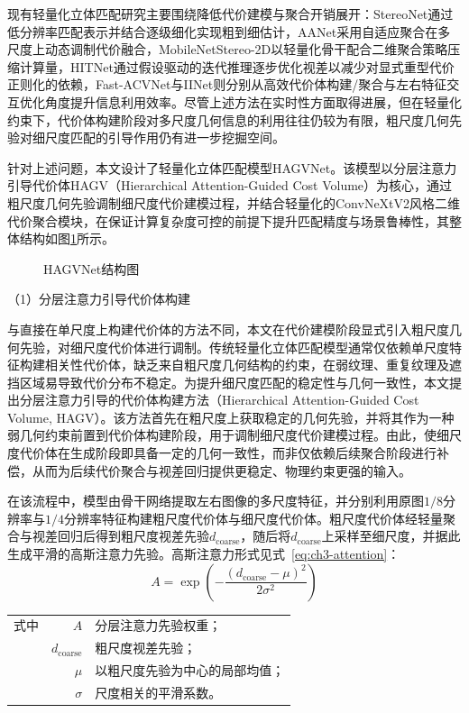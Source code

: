 现有轻量化立体匹配研究主要围绕降低代价建模与聚合开销展开：StereoNet\cite{khamisStereonetGuidedHierarchical2018a}通过低分辨率匹配表示并结合逐级细化实现粗到细估计，AANet\cite{xuAANetAdaptiveAggregation2020}采用自适应聚合在多尺度上动态调制代价融合，MobileNetStereo-2D\cite{shamsafarMobilestereonetLightweightDeep2022a}以轻量化骨干配合二维聚合策略压缩计算量，HITNet\cite{tankovichHitnetHierarchicalIterative2021a}通过假设驱动的迭代推理逐步优化视差以减少对显式重型代价正则化的依赖，Fast-ACVNet\cite{xuAccurateEfficientStereo2023}与IINet\cite{liIinetImplicitIntrainter2024}则分别从高效代价体构建/聚合与左右特征交互优化角度提升信息利用效率。尽管上述方法在实时性方面取得进展，但在轻量化约束下，代价体构建阶段对多尺度几何信息的利用往往仍较为有限，粗尺度几何先验对细尺度匹配的引导作用仍有进一步挖掘空间。

针对上述问题，本文设计了轻量化立体匹配模型HAGVNet。该模型以分层注意力引导代价体HAGV（Hierarchical Attention-Guided Cost Volume）为核心，通过粗尺度几何先验调制细尺度代价建模过程，并结合轻量化的ConvNeXtV2\cite{wooConvnextV2Codesigning2023a}风格二维代价聚合模块，在保证计算复杂度可控的前提下提升匹配精度与场景鲁棒性，其整体结构如图\ref{HAGVNet结构图}所示。

\begin{figure}[h]
  \centering
  
  \caption{HAGVNet结构图}
  \label{HAGVNet结构图}
\end{figure}

（1）分层注意力引导代价体构建

与直接在单尺度上构建代价体的方法不同，本文在代价建模阶段显式引入粗尺度几何先验，对细尺度代价体进行调制。传统轻量化立体匹配模型通常仅依赖单尺度特征构建相关性代价体，缺乏来自粗尺度几何结构的约束，在弱纹理、重复纹理及遮挡区域易导致代价分布不稳定。为提升细尺度匹配的稳定性与几何一致性，本文提出分层注意力引导的代价体构建方法（Hierarchical Attention-Guided Cost Volume, HAGV）。该方法首先在粗尺度上获取稳定的几何先验，并将其作为一种弱几何约束前置到代价体构建阶段，用于调制细尺度代价建模过程。由此，使细尺度代价体在生成阶段即具备一定的几何一致性，而非仅依赖后续聚合阶段进行补偿，从而为后续代价聚合与视差回归提供更稳定、物理约束更强的输入。

在该流程中，模型由骨干网络提取左右图像的多尺度特征，并分别利用原图$1/8$分辨率与$1/4$分辨率特征构建粗尺度代价体与细尺度代价体。粗尺度代价体经轻量聚合与视差回归后得到粗尺度视差先验$d_{\text{coarse}}$，随后将$d_{\text{coarse}}$上采样至细尺度，并据此生成平滑的高斯注意力先验。高斯注意力形式见式~\eqref{eq:ch3-attention}：
\begin{equation}\label{eq:ch3-attention}
A=\exp\left(-\frac{(d_{\text{coarse}}-\mu)^2}{2\sigma^2}\right)
\end{equation}
\begin{tabularx}{\textwidth}{@{}l@{\quad}r@{———}X@{}}
式中& $A$ & 分层注意力先验权重；\\
& $d_{\text{coarse}}$ & 粗尺度视差先验；\\
& $\mu$ & 以粗尺度先验为中心的局部均值；\\
& $\sigma$ & 尺度相关的平滑系数。\\
\end{tabularx}\vspace{3.15bp}

